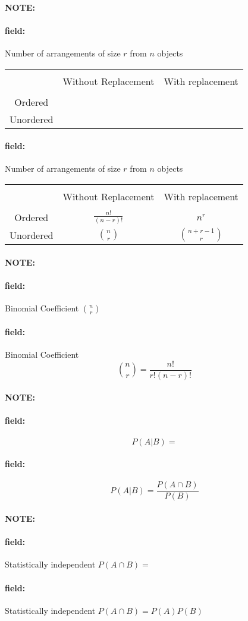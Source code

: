 \documentclass[12pt]{article}
\newenvironment{note}{\paragraph{NOTE:}}{}
\newenvironment{field}{\paragraph{field:}}{}
\begin{document}
\begin{note}
  \begin{field}
    Number of arrangements of size $r$ from $n$ objects

    \begin{tabular}{|c| c c|}
      \hline \\
       & Without Replacement & With replacement\\
       \hline \\
       Ordered & & \\
       Unordered & & \\
       \hline
    \end{tabular}
  \end{field}
  \begin{field}
    Number of arrangements of size $r$ from $n$ objects

    \begin{tabular}{|c| c c|}
      \hline \\
       & Without Replacement & With replacement\\
       \hline \\
       Ordered & $\frac{n!}{(n-r)!}$ & $n^r$ \\
       Unordered & $\binom{n}{r}$& $\binom{n+r-1}{r}$ \\
       \hline
    \end{tabular}
  \end{field}
\end{note}



\begin{note}
    \begin{field}
        Binomial Coefficient $\binom{n}{r}$
    \end{field}
    \begin{field}
      Binomial Coefficient
        $$\binom{n}{r} = \frac{n!}{r!(n-r)!}$$
    \end{field}
\end{note}

\begin{note}
  \begin{field}
    $$P(A|B)=$$
  \end{field}
  \begin{field}
    $$ P(A|B) = \frac{P(A \cap B)}{P(B)} $$
  \end{field}
\end{note}

\begin{note}
  \begin{field}
    Statistically independent
    $P(A \cap B) = $
  \end{field}
  \begin{field}
    Statistically independent
    $P(A \cap B) = P(A)P(B)$
  \end{field}
\end{note}
\end{document}
